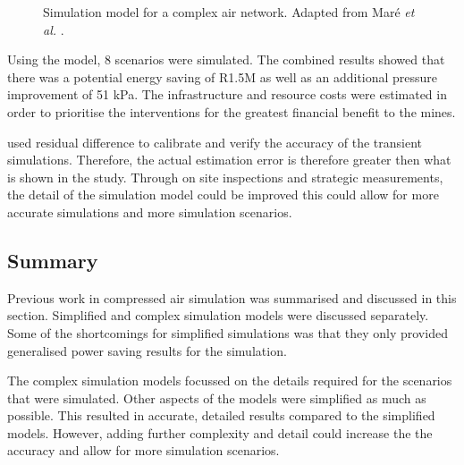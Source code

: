  \begin{figure}[h!]
 	\centering
 	\caption[Simulation model for a complex air network.]{Simulation model for a complex air network. Adapted from Maré \textit{et al.} \cite{Mare2017Evaluating}.}
 	\label{fig:Mare model}
 \end{figure}
\par 
Using the model, 8 scenarios were simulated. The combined results showed that there was a potential energy saving of R1.5M as well as an additional pressure improvement of 51 kPa. The infrastructure and resource costs were estimated in order to prioritise the interventions for the greatest financial benefit to the mines.	
\par
	\cite{Mare2017Evaluating} used residual difference to calibrate and verify the accuracy of the transient simulations. Therefore, the actual estimation error is therefore greater then what is shown in the study. Through on site inspections and strategic measurements, the detail of the simulation model could be improved this could allow for more accurate simulations and more simulation scenarios.
	\subsection{Summary}\label{Shortcomings of previous work}
	Previous work in compressed air simulation was summarised and discussed in this section. Simplified and complex simulation models were discussed separately. Some of the shortcomings for simplified simulations was that they only provided generalised power saving results for the simulation.
	\par 
	The complex simulation models focussed on the details required for the scenarios that were simulated. Other aspects of the models were simplified as much as possible. This resulted in accurate, detailed results compared to the simplified models. However, adding further complexity and detail could increase the the accuracy and allow for more simulation scenarios.
